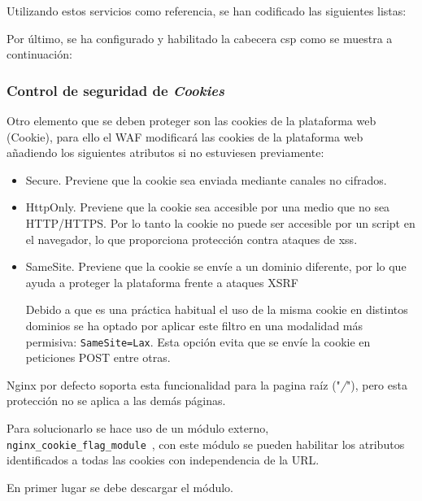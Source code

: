 \par Utilizando estos servicios como referencia, se han codificado las siguientes listas: \\
\begin{minipage}{\linewidth}
  
\end{minipage}

\par Por último, se ha configurado y habilitado la cabecera \acrshort{csp} como se muestra a continuación: \\
\begin{minipage}{\linewidth}
  
\end{minipage}

\subsubsection{Control de seguridad de {\em Cookies}}
\par Otro elemento que se deben proteger son las cookies de la plataforma web (\gls{Cookie}), para ello el WAF modificará las cookies de la plataforma web añadiendo los siguientes atributos si no estuviesen previamente:
\begin{itemize}
  \item Secure. Previene que la cookie sea enviada mediante canales no cifrados.
  \item HttpOnly. Previene que la cookie sea accesible por una medio que no sea HTTP/HTTPS. Por lo tanto la cookie no puede ser accesible por un script en el navegador, lo que proporciona protección contra ataques de
    \acrshort{xss}.
  \item SameSite. Previene que la cookie se envíe a un dominio diferente, por lo que ayuda a proteger la plataforma frente a ataques \gls{XSRF}
    \par Debido a que es una práctica habitual el uso de la misma cookie en distintos dominios se ha optado por aplicar este filtro en una modalidad más permisiva: \lstinline{SameSite=Lax}. Esta opción evita que se envíe
    la cookie en peticiones POST entre otras.
\end{itemize}

\par Nginx por defecto soporta esta funcionalidad para la pagina raíz ("{\em /}"), pero esta protección no se aplica a las demás páginas.
\par Para solucionarlo se hace uso de un módulo externo, \lstinline{nginx_cookie_flag_module}~\cite{nginx_cookie}, con este módulo se pueden habilitar los atributos identificados a todas las cookies con independencia de la URL.
\par En primer lugar se debe descargar el módulo.
  


